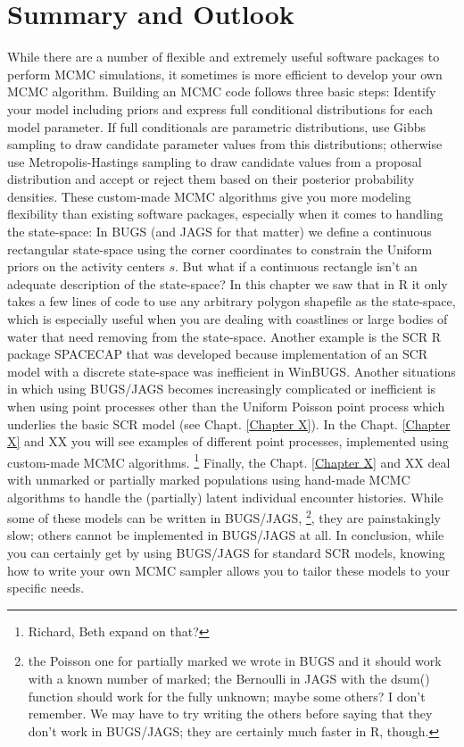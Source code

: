 \section{Summary and Outlook}
While there are a number of flexible and extremely useful software packages to perform MCMC simulations, it sometimes is more efficient to develop your own MCMC algorithm. Building an MCMC code follows three basic steps: Identify your model including priors and express full conditional distributions for each model parameter. If full conditionals are parametric distributions, use Gibbs sampling to draw candidate parameter values from this distributions; otherwise use Metropolis-Hastings sampling to draw candidate values from a proposal distribution and accept or reject them based on their posterior probability densities.
These custom-made MCMC algorithms give you more modeling flexibility than existing software packages, especially when it comes to handling the state-space: In BUGS (and JAGS for that matter) we define a continuous rectangular state-space using the corner coordinates to constrain the Uniform priors on the activity centers $s$. But what if a continuous rectangle isn't an adequate description of the state-space? In this chapter we saw that in R it only takes a few lines of code to use any arbitrary polygon shapefile as the state-space, which is especially useful when you are dealing with coastlines or large bodies of water that need removing from the state-space. Another example is the SCR R package SPACECAP \citep{gopalaswamy_etal:2011} that was developed because implementation of an SCR model with a discrete state-space was inefficient in WinBUGS.
Another situations in which using BUGS/JAGS becomes increasingly complicated or inefficient is when using point processes other than the Uniform Poisson point process which underlies the basic SCR model (see Chapt. \ref {Chapter X}). In the Chapt. \ref {Chapter X} and XX you will see examples of different point processes, implemented using custom-made MCMC algorithms. \footnote{Richard, Beth expand on that?}
Finally, the Chapt. \ref {Chapter X} and XX deal with unmarked or partially marked populations using hand-made MCMC algorithms to handle the (partially) latent individual encounter histories. While some of these models can be written in BUGS/JAGS, \footnote{the Poisson one for partially marked we wrote in BUGS and it should work with a known number of marked; the Bernoulli in JAGS with the dsum() function should work for the fully unknown; maybe some others? I don’t remember. We may have to try writing the others before saying that they don’t work in BUGS/JAGS; they are certainly much faster in R, though.}, they are painstakingly slow; others cannot be implemented in BUGS/JAGS at all.
In conclusion, while you can certainly get by using BUGS/JAGS for standard SCR models, knowing how to write your own MCMC sampler allows you to tailor these models to your specific needs.
